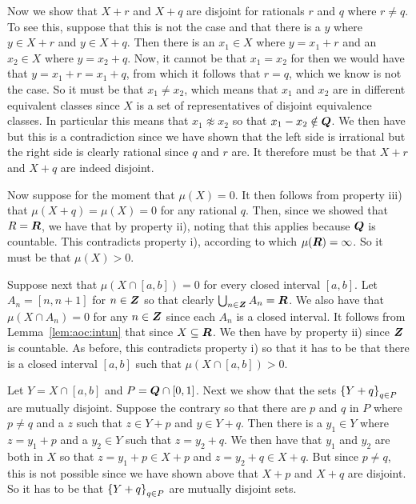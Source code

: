 \begin{questions}
{{  Now we show that $X + r$ and $X + q$ are disjoint for rationals $r$ and $q$ where $r \neq q$.
  To see this, suppose that this is not the case and that there is a $y$ where $y \in X + r$ and $y \in X + q$.
  Then there is an $x_1 \in X$ where $y = x_1 + r$ and an $x_2 \in X$ where $y = x_2 + q$.
  Now, it cannot be that $x_1 = x_2$ for then we would have that $y = x_1 + r = x_1 + q$, from which it follows that $r = q$, which we know is not the case.
  So it must be that $x_1 \neq x_2$, which means that $x_1$ and $x_2$ are in different equivalent classes since $X$ is a set of representatives of disjoint equivalence classes.
  In particular this means that $x_1 \not \approx x_2$ so that $x_1 - x_2 \notin {\boldsymbol{Q}}$.
  We then have
  but this is a contradiction since we have shown that the left side is irrational but the right side is clearly rational since $q$ and $r$ are.
  It therefore must be that $X + r$ and $X + q$ are indeed disjoint.

  Now suppose for the moment that $\mu(X) = 0$.
  It then follows from property iii) that $\mu(X + q) = \mu(X) = 0$ for any rational $q$.
  Then, since we showed that $R = {\boldsymbol{R}}$, we have that
  by property ii), noting that this applies because ${\boldsymbol{Q}}$ is countable.
  This contradicts property i), according to which $\mu({\boldsymbol{R}}) = \infty$.
  So it must be that $\mu(X) > 0$.

  Suppose next that $\mu(X \cap [a, b]) = 0$ for every closed interval $[a,b]$.
  Let $A_n = [n, n+1]$ for $n \in {\boldsymbol{Z}}$ so that clearly $\bigcup_{n \in {\boldsymbol{Z}}} A_n = {\boldsymbol{R}}$.
  We also have that $\mu(X \cap A_n) = 0$ for any $n \in {\boldsymbol{Z}}$ since each $A_n$ is a closed interval.
  It follows from Lemma~\ref{lem:aoc:intun} that
  since $X \subseteq {\boldsymbol{R}}$.
  We then have
  by property ii) since ${\boldsymbol{Z}}$ is countable.
  As before, this contradicts property i) so that it has to be that there is a closed interval $[a,b]$ such that $\mu(X \cap [a,b]) > 0$.

  Let $Y = X \cap [a,b]$ and $P = {\boldsymbol{Q}} \cap [0,1]$.
  Next we show that the sets $\left\{ Y + q \right\}_{q \in P}$ are mutually disjoint.
  Suppose the contrary so that there are $p$ and $q$ in $P$ where $p \neq q$ and a $z$ such that $z \in Y + p$ and $y \in Y + q$.
  Then there is a $y_1 \in Y$ where $z = y_1 + p$ and a $y_2 \in Y$ such that $z = y_2 + q$.
  We then have that $y_1$ and $y_2$ are both in $X$ so that $z = y_1 + p \in X + p$ and $z = y_2 + q \in X + q$.
  But since $p \neq q$, this is not possible since we have shown above that $X + p$ and $X + q$ are disjoint.
  So it has to be that $\left\{ Y + q \right\}_{q \in P}$ are mutually disjoint sets.

}}
\end{questions}
